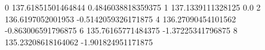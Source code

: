 0 137.61851501464844 0.4846038818359375
1 137.1339111328125 0.0
2 136.6197052001953 -0.5142059326171875
4 136.27090454101562 -0.863006591796875
6 135.76165771484375 -1.37225341796875
8 135.23208618164062 -1.901824951171875
